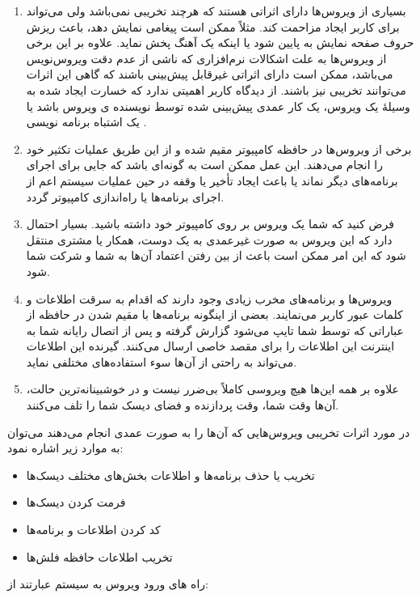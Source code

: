 \documentclass[12pt]{book}
\begin{document}
\begin{enumerate}
	\item بسیاری از ویروس‌ها دارای اثراتی هستند که هرچند تخریبی نمی‌باشد ولی می‌تواند برای کاربر ایجاد مزاحمت کند. مثلاً ممکن است پیغامی نمایش دهد، باعث ریزش حروف صفحه نمایش به پایین شود یا اینکه یک آهنگ پخش نماید. علاوه بر این برخی از ویروس‌ها به علت اشکالات نرم‌افزاری که ناشی از عدم دقت ویروس‌نویس می‌باشد، ممکن است دارای اثراتی غیرقابل پیش‌بینی باشند که گاهی این اثرات می‌توانند تخریبی نیز باشند. از دیدگاه کاربر اهمیتی ندارد که خسارت ایجاد شده به وسیلهٔ یک ویروس، یک کار عمدی پیش‌بینی شده توسط            
	نویسنده ی ویروس باشد یا یک اشتباه برنامه نویسی .  
	\item برخی از ویروس‌ها در حافظه کامپیوتر مقیم شده و از این طریق عملیات تکثیر خود را انجام می‌دهند. این عمل ممکن است به گونه‌ای باشد که جایی برای اجرای برنامه‌های دیگر نماند یا باعث ایجاد تأخیر یا وقفه در حین عملیات سیستم اعم از اجرای برنامه‌ها یا راه‌اندازی کامپیوتر گردد. 
	\item فرض کنید که شما یک ویروس بر روی کامپیوتر خود داشته باشید. بسیار احتمال دارد که این ویروس به صورت غیرعمدی به یک دوست، همکار یا مشتری منتقل شود که این امر ممکن است باعث از بین رفتن اعتماد آن‌ها به شما و شرکت شما شود. 
	\item ویروس‌ها و برنامه‌های مخرب زیادی وجود دارند که اقدام به سرقت اطلاعات و کلمات عبور کاربر می‌نمایند. بعضی از اینگونه برنامه‌ها با مقیم شدن در حافظه از عباراتی که توسط شما تایپ می‌شود گزارش گرفته و پس از اتصال رایانه شما به اینترنت این اطلاعات را برای مقصد خاصی ارسال می‌کنند. گیرنده این اطلاعات می‌تواند به راحتی از آن‌ها سوء استفاده‌های مختلفی نماید. 
	\item علاوه بر همه این‌ها هیچ ویروسی کاملاً بی‌ضرر نیست و در خوشبینانه‌ترین حالت، آن‌ها وقت شما، وقت پردازنده و فضای دیسک شما را تلف می‌کنند. 
\end{enumerate}

در مورد اثرات تخریبی ویروس‌هایی که آن‌ها را به صورت عمدی انجام می‌دهند می‌توان به موارد زیر اشاره نمود: 


\begin{itemize}
	\item تخریب یا حذف برنامه‌ها و اطلاعات بخش‌های مختلف دیسک‌ها
	\item فرمت کردن دیسک‌ها
	\item کد کردن اطلاعات و برنامه‌ها
	\item تخریب اطلاعات حافظه فلش‌ها
\end{itemize}



 راه های ورود ویروس به سیستم عبارتند از: 
 
\end{document}
